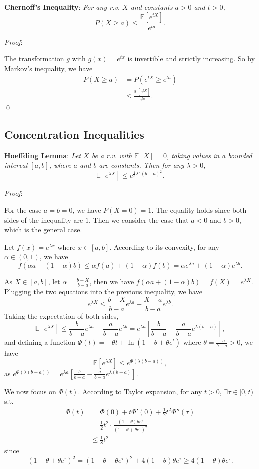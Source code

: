 \documentclass{progartcn}
\begin{document}
		\textbf{Chernoff's Inequality}: \textit{For any r.v. $X$ and constants $a>0$ and $t>0$,}
			\[P(X\ge a)\le \frac{\mathbb{E}[e^{tX}]}{e^{ta}}.\]

			\textit{Proof}:

			The transformation $g$ with $g(x)=e^{tx}$ is invertible and strictly increasing. So by Markov's inequality, we have
			\[\begin{split}
			P(X\ge a)&=P(e^{tX}\ge e^{ta})\\
			&\le \frac{\mathbb{E}[e^{tX}]}{e^{ta}}.
			\end{split}
			\]
			\qed

	\subsection{Concentration Inequalities}

		\textbf{Hoeffding Lemma}: \textit{Let $X$ be a r.v. with $\mathbb{E}[X]=0$, taking values in a bounded interval $[a, b]$, where $a$ and $b$ are constants. Then for any $\lambda>0$,}
			\[\mathbb{E}[e^{\lambda X}]\le e^{\frac{1}{8} \lambda^2(b-a)^2}.\]

			\textit{Proof}:

			For the case $a=b=0$, we have $P(X=0)=1$. The equality holds since both sides of the inequality are $1$. Then we consider the case that $a<0$ and $b>0$, which is the general case.

			Let $f(x)=e^{\lambda x}$ where $x\in [a,b]$. According to its convexity, for any $\alpha\in (0,1)$, we have
			\[f(\alpha a +(1-\alpha)b)\le \alpha f(a)+(1-\alpha)f(b)=\alpha e^{\lambda a}+(1-\alpha)e^{\lambda b}.\]

			As $X\in [a,b]$, let $\alpha = \frac{b-X}{b-a}$, then we have $f(\alpha a+(1-\alpha)b)=f(X)=e^{\lambda X}$. Plugging the two equations into the previous inequality, we have
			\[e^{\lambda X}\le \frac{b-X}{b-a}e^{\lambda a}+\frac{X-a}{b-a}e^{\lambda b}.
			\]
			Taking the expectation of both sides,
			\[\mathbb{E}[e^{\lambda X}]\le \frac{b}{b-a}e^{\lambda a}-\frac{a}{b-a}e^{\lambda b}=e^{\lambda a}\left[\frac{b}{b-a}-\frac{a}{b-a}e^{\lambda(b-a)}\right],\]
			and defining a function $\Phi(t)=-\theta t +\ln (1-\theta+\theta e^t)$ where $\theta=\frac{-a}{b-a} >0$, we have
			\[\mathbb{E}[e^{\lambda X}]\le e^{\Phi(\lambda(b-a))},\]
			as $e^{\Phi(\lambda(b-a))}=e^{\lambda a}\left[\frac{b}{b-a}-\frac{a}{b-a}e^{\lambda(b-a)}\right].$

			We now focus on $\Phi(t)$. According to Taylor expansion, for any $t>0$, $\exists \tau\in[0,t)$ s.t.
			\[\begin{split}
			\Phi(t)&=\Phi(0)+t\Phi'(0)+\frac{1}{2}t^2\Phi''(\tau)\\
			&=\frac{1}{2} t^2\cdot \frac{(1-\theta)\theta e^\tau}{(1-\theta+\theta e^\tau)^2}\\
			&\le \frac{1}{8}t^2
			\end{split}
			\]
			since
			\[(1-\theta+\theta e^\tau)^2=(1-\theta-\theta e^\tau)^2+4(1-\theta)\theta e^\tau\ge 4(1-\theta)\theta e^\tau.\]
\end{document}
